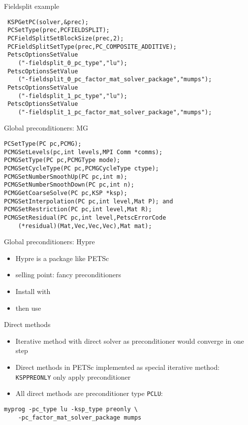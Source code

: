 \begin{numberedframe}{Fieldsplit example}
\begin{lstlisting}
 KSPGetPC(solver,&prec);
 PCSetType(prec,PCFIELDSPLIT);
 PCFieldSplitSetBlockSize(prec,2);
 PCFieldSplitSetType(prec,PC_COMPOSITE_ADDITIVE);
 PetscOptionsSetValue
    ("-fieldsplit_0_pc_type","lu");
 PetscOptionsSetValue
    ("-fieldsplit_0_pc_factor_mat_solver_package","mumps");
 PetscOptionsSetValue
    ("-fieldsplit_1_pc_type","lu");
 PetscOptionsSetValue
    ("-fieldsplit_1_pc_factor_mat_solver_package","mumps");
\end{lstlisting}
\end{numberedframe}

\begin{numberedframe}{Global preconditioners: MG}
\begin{lstlisting}
PCSetType(PC pc,PCMG);
PCMGSetLevels(pc,int levels,MPI Comm *comms);
PCMGSetType(PC pc,PCMGType mode);
PCMGSetCycleType(PC pc,PCMGCycleType ctype);
PCMGSetNumberSmoothUp(PC pc,int m);
PCMGSetNumberSmoothDown(PC pc,int n);
PCMGGetCoarseSolve(PC pc,KSP *ksp);
PCMGSetInterpolation(PC pc,int level,Mat P); and
PCMGSetRestriction(PC pc,int level,Mat R);
PCMGSetResidual(PC pc,int level,PetscErrorCode
    (*residual)(Mat,Vec,Vec,Vec),Mat mat);
\end{lstlisting}
\end{numberedframe}

\begin{numberedframe}{Global preconditioners: Hypre}
  \begin{itemize}
  \item Hypre is a package like PETSc
  \item selling point: fancy preconditioners
  \item Install with 
  \item then use 
  \end{itemize}
  
\end{numberedframe}

\begin{details}
\begin{numberedframe}{Direct methods}
  \begin{itemize}
  \item Iterative method with direct solver as preconditioner would
    converge in one step
  \item Direct methods in PETSc implemented as special iterative
    method: \lstinline{KSPPREONLY} only apply preconditioner
  \item All direct methods are preconditioner type \lstinline{PCLU}: 
  \end{itemize}
\begin{verbatim}
myprog -pc_type lu -ksp_type preonly \
    -pc_factor_mat_solver_package mumps 
\end{verbatim}
\end{numberedframe}

\end{details}

